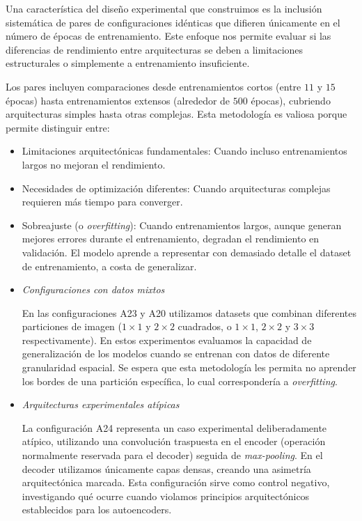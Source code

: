 Una característica del diseño experimental que construimos es la inclusión sistemática de pares de configuraciones idénticas que difieren únicamente en el número de épocas de entrenamiento. Este enfoque nos permite evaluar si las diferencias de rendimiento entre arquitecturas se deben a limitaciones estructurales o simplemente a entrenamiento insuficiente.

Los pares incluyen comparaciones desde entrenamientos cortos (entre $11$ y $15$ épocas) hasta entrenamientos extensos (alrededor de $500$ épocas), cubriendo arquitecturas simples hasta otras complejas. Esta metodología es valiosa porque permite distinguir entre:

\begin{itemize}
    \item Limitaciones arquitectónicas fundamentales: Cuando incluso entrenamientos largos no mejoran el rendimiento.
    \item Necesidades de optimización diferentes: Cuando arquitecturas complejas requieren más tiempo para converger.
    \item Sobreajuste (o \emph{overfitting}): Cuando entrenamientos largos, aunque generan mejores errores durante el entrenamiento, degradan el rendimiento en validación. El modelo aprende a representar con demasiado detalle el dataset de entrenamiento, a costa de generalizar.
\end{itemize}


\begin{itemize}
    \item \emph{Configuraciones con datos mixtos}

    En las configuraciones A23 y A20 utilizamos datasets que combinan diferentes particiones de imagen ($1\times 1$ y $2\times 2$ cuadrados, o $1\times 1$, $2\times 2$ y $3\times 3$ respectivamente). En estos experimentos evaluamos la capacidad de generalización de los modelos cuando se entrenan con datos de diferente granularidad espacial. Se espera que esta metodología les permita no aprender los bordes de una partición específica, lo cual correspondería a \emph{overfitting}.

    \item \emph{Arquitecturas experimentales atípicas}

    La configuración A24 representa un caso experimental deliberadamente atípico, utilizando una convolución traspuesta en el encoder (operación normalmente reservada para el decoder) seguida de \emph{max-pooling}. En el decoder utilizamos únicamente capas densas, creando una asimetría arquitectónica marcada. Esta configuración sirve como control negativo, investigando qué ocurre cuando violamos principios arquitectónicos establecidos para los autoencoders.
\end{itemize}

